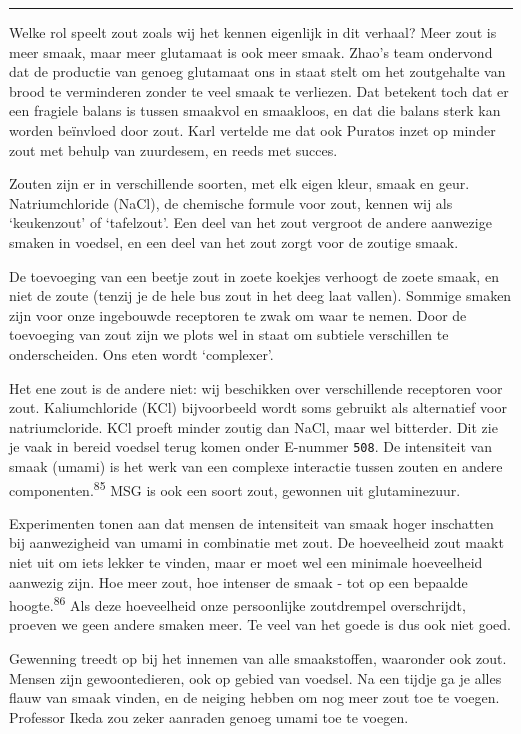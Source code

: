 \documentclass[
  11pt,
  dutch,
]{memoir}
\begin{document}
\pfbreak

Welke rol speelt zout zoals wij het kennen eigenlijk in dit verhaal?
Meer zout is meer smaak, maar meer glutamaat is ook meer smaak. Zhao's
team ondervond dat de productie van genoeg glutamaat ons in staat stelt
om het zoutgehalte van brood te verminderen zonder te veel smaak te
verliezen. Dat betekent toch dat er een fragiele balans is tussen
smaakvol en smaakloos, en dat die balans sterk kan worden beïnvloed door
zout. Karl vertelde me dat ook Puratos inzet op minder zout met behulp
van zuurdesem, en reeds met succes.

Zouten zijn er in verschillende soorten, met elk eigen kleur, smaak en
geur. Natriumchloride (NaCl), de chemische formule voor zout, kennen wij
als `keukenzout' of `tafelzout'. Een deel van het zout vergroot de
andere aanwezige smaken in voedsel, en een deel van het zout zorgt voor
de zoutige smaak.

De toevoeging van een beetje zout in zoete koekjes verhoogt de zoete
smaak, en niet de zoute (tenzij je de hele bus zout in het deeg laat
vallen). Sommige smaken zijn voor onze ingebouwde receptoren te zwak om
waar te nemen. Door de toevoeging van zout zijn we plots wel in staat om
subtiele verschillen te onderscheiden. Ons eten wordt `complexer'.

Het ene zout is de andere niet: wij beschikken over verschillende
receptoren voor zout. Kaliumchloride (KCl) bijvoorbeeld wordt soms
gebruikt als alternatief voor natriumcloride. KCl proeft minder zoutig
dan NaCl, maar wel bitterder. Dit zie je vaak in bereid voedsel terug
komen onder E-nummer \texttt{508}. De intensiteit van smaak (umami) is
het werk van een complexe interactie tussen zouten en andere
componenten.\textsuperscript{85} MSG is ook een soort zout, gewonnen uit
glutaminezuur.

Experimenten tonen aan dat mensen de intensiteit van smaak hoger
inschatten bij aanwezigheid van umami in combinatie met zout. De
hoeveelheid zout maakt niet uit om iets lekker te vinden, maar er moet
wel een minimale hoeveelheid aanwezig zijn. Hoe meer zout, hoe intenser
de smaak - tot op een bepaalde hoogte.\textsuperscript{86} Als deze
hoeveelheid onze persoonlijke zoutdrempel overschrijdt, proeven we geen
andere smaken meer. Te veel van het goede is dus ook niet goed.

Gewenning treedt op bij het innemen van alle smaakstoffen, waaronder ook
zout. Mensen zijn gewoontedieren, ook op gebied van voedsel. Na een
tijdje ga je alles flauw van smaak vinden, en de neiging hebben om nog
meer zout toe te voegen. Professor Ikeda zou zeker aanraden genoeg umami
toe te voegen.
\end{document}

